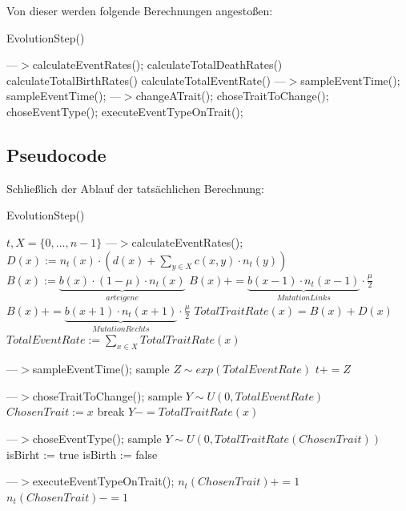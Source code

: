 \documentclass[11pt, a4paper, german]{article}
\begin{document}
	Von dieser werden folgende Berechnungen angestoßen:
		
	\begin{algorithm}[H]
		\caption{EvolutionStep()}
		\begin{algorithmic}[1]
			\STATE ---$>$calculateEventRates();
			\STATE calculateTotalDeathRates()
			\STATE calculateTotalBirthRates()
			\STATE calculateTotalEventRate()
			\STATE ---$>$sampleEventTime();
			\STATE sampleEventTime();
			\STATE ---$>$changeATrait();
			\STATE choseTraitToChange();
			\STATE choseEventType();
			\STATE executeEventTypeOnTrait();
		\end{algorithmic}
	\end{algorithm}
	
	\subsection{Pseudocode}
	Schließlich der Ablauf der tatsächlichen Berechnung:
	
	\begin{algorithm}[H]
		\caption{EvolutionStep()}
		\begin{algorithmic}[1]
			\REQUIRE $ t, X = \{0,\dots, n-1\} $
			\STATE ---$>$calculateEventRates();
				\STATE $  D(x) := n_t(x) \cdot \left( d(x) + \sum_{y \in X} c(x,y) \cdot n_t(y) \right) $
				\STATE $ B(x) := \underbrace{b(x) \cdot (1 - \mu) \cdot n_t(x)}_{arteigene}  $
					\STATE $ B(x) += \underbrace{b(x-1)\cdot n_t(x-1)}_{Mutation Links} \cdot \frac{\mu}{2} $
				\ENDIF
					\STATE $ B(x) += \underbrace{b(x+1)\cdot n_t(x+1)}_{Mutation Rechts} \cdot \frac{\mu}{2} $
				\ENDIF
				\STATE $ TotalTraitRate(x) = B(x) + D(x) $
			\ENDFOR
			\STATE $ TotalEventRate := \sum_{x \in X} TotalTraitRate(x) $
			
			\STATE ---$>$sampleEventTime();
			\STATE sample $ Z \sim exp(TotalEventRate) $
			\STATE $ t += Z $
			
			\STATE ---$>$choseTraitToChange();
			\STATE sample $ Y \sim U(0,TotalEventRate) $
					\STATE $ ChosenTrait := x $
					\STATE break
				\ENDIF
				\STATE $ Y -= TotalTraitRate(x) $
			\ENDFOR
			
			\STATE ---$>$choseEventType();
			\STATE sample $ Y \sim U(0,TotalTraitRate(ChosenTrait)) $
				\STATE isBirht := true
			\ELSE
				\STATE isBirth := false
			\ENDIF
			
			\STATE ---$>$executeEventTypeOnTrait();
				\STATE $ n_t(ChosenTrait) += 1 $
			\ELSE
					\STATE $ n_t(ChosenTrait) -= 1 $
				\ENDIF
			\ENDIF
		\end{algorithmic}
	\end{algorithm}
	
\end{document}
